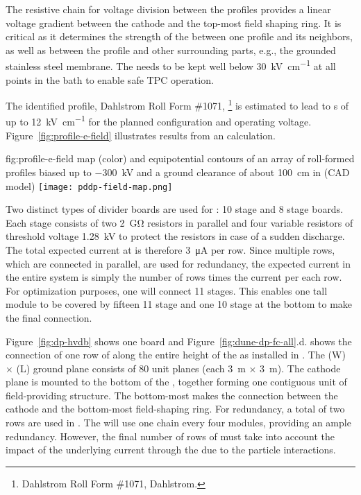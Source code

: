 The resistive chain for voltage division between the profiles provides a linear voltage gradient between the cathode and the top-most field shaping ring. It is critical as it determines the strength of the \efield between one profile and its neighbors, as well as between the profile and other surrounding parts, e.g., the grounded stainless steel membrane. The \efield needs to be kept well below \SI{30}{\kV\per\cm} at all points in the \lar bath to enable safe TPC operation.

The identified profile, Dahlstrom Roll Form \#1071,
\footnote{Dahlstrom Roll Form \#1071, Dahlstrom\texttrademark{}.}  is estimated to lead to \efield{}s of up to \SI{12}{\kV\per\cm}  
for the planned  configuration and operating voltage. Figure~\ref{fig:profile-e-field} illustrates results from an \efield calculation.


\begin{dunefigure}
{fig:profile-e-field}
{\efield map (color) and equipotential contours of an array of roll-formed profiles biased up to \SI{-300}{\kV} and a ground clearance of about \SI{100}{\cm} in  (CAD model)} 
\texttt{[image: pddp-field-map.png]}
\end{dunefigure}

Two distinct types of  divider boards are used for : \num{10} stage and \num{8} stage boards.  Each stage consists of two \SI{2}{\giga\ohm} resistors in parallel and four variable resistors of threshold voltage \SI{1.28}{kV} to protect the resistors in case of a sudden discharge.  The total expected current at \dptargetdriftvoltpos is therefore \SI{3}{\micro\ampere} per row.  Since multiple rows, which are connected in parallel, are used for redundancy, the expected current in the entire system is simply the number of rows times the current per each row.
For optimization purposes, one   will connect \num{11} stages.  This enables  one \tpcheight tall module to be covered by fifteen \num{11} stage  and one \num{10} stage  at the bottom to make the final connection.  


Figure~\ref{fig:dp-hvdb} shows one  board and  Figure~\ref{fig:dune-dp-fc-all}.d. shows the connection of one row of  along the entire height of the  as installed in . The  \dptpcwdth (W) $\times$ \dptpclen (L) ground plane consists of \num{80} unit planes (each \SI{3}{\m} $\times$ \SI{3}{\m}).  
The cathode plane is mounted to the bottom of the , together forming one contiguous unit of field-providing structure.  The bottom-most  makes the connection between the cathode and the bottom-most field-shaping ring.
For redundancy, a total of two  rows are used in .  
The \dpmod will use one  chain every four  modules, providing an ample redundancy.  However, the final number of rows of  must take into account the impact of the underlying current through the  due to the particle interactions.


